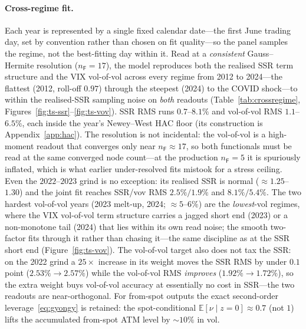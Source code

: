 \documentclass[11pt]{article}
\newcommand{\E}{\mathbb{E}}
\begin{document}
\paragraph{Cross-regime fit.} Each year is represented by a single fixed calendar date---the first June
trading day, set by convention rather than chosen on fit quality---so the panel samples the regime, not the
best-fitting day within it. Read at a \emph{consistent} Gauss--Hermite resolution ($n_{\mathsf F}{=}17$),
the model reproduces both the realised SSR term structure and the VIX vol-of-vol across every regime from
2012 to 2024---the flattest (2012, roll-off $0.97$) through the steepest (2024) to the COVID shock---to within
the realised-SSR sampling noise on \emph{both} readouts (Table~\ref{tab:crossregime},
Figures~\ref{fig:ts-ssr}--\ref{fig:ts-vov}). SSR RMS runs $0.7$--$8.1\%$ and vol-of-vol RMS $1.1$--$6.5\%$, each
inside the year's Newey--West HAC floor (its construction is Appendix~\ref{app:hac}). The resolution is not incidental: the vol-of-vol is a high-moment
readout that converges only near $n_{\mathsf F}{\approx}17$, so both functionals must be read at the same
converged node count---at the production $n_{\mathsf F}{=}5$ it is spuriously inflated, which is what
earlier under-resolved fits mistook for a stress ceiling. Even the $2022$--$2023$ grind is no exception: its
realised SSR is normal (${\approx}1.25$--$1.30$) and the joint fit reaches SSR/vov RMS $2.5\%/1.9\%$ and
$8.1\%/5.4\%$. The two hardest vol-of-vol years (2023 melt-up, 2024; ${\approx}5$--$6\%$) are the
\emph{lowest}-vol regimes, where the VIX vol-of-vol term structure carries a jagged short end (2023) or a
non-monotone tail (2024) that lies within its own read noise; the smooth two-factor fits through it rather
than chasing it---the same discipline as at the SSR short end (Figure~\ref{fig:ts-vov}). The vol-of-vol
target also does not tax the SSR: on the 2022 grind a $25\times$ increase in its weight moves the SSR RMS by
under $0.1$ point ($2.53\%\!\to\!2.57\%$) while the vol-of-vol RMS \emph{improves} ($1.92\%\!\to\!1.72\%$), so
the extra weight buys vol-of-vol accuracy at essentially no cost in SSR---the two readouts are near-orthogonal. For from-spot outputs the exact second-order
leverage~\eqref{eq:gyongy} is retained: the spot-conditional $\E[\nu\mid z{=}0]\approx0.7$ (not $1$) lifts the
accumulated from-spot ATM level by ${\sim}10\%$ in vol.
\end{document}
